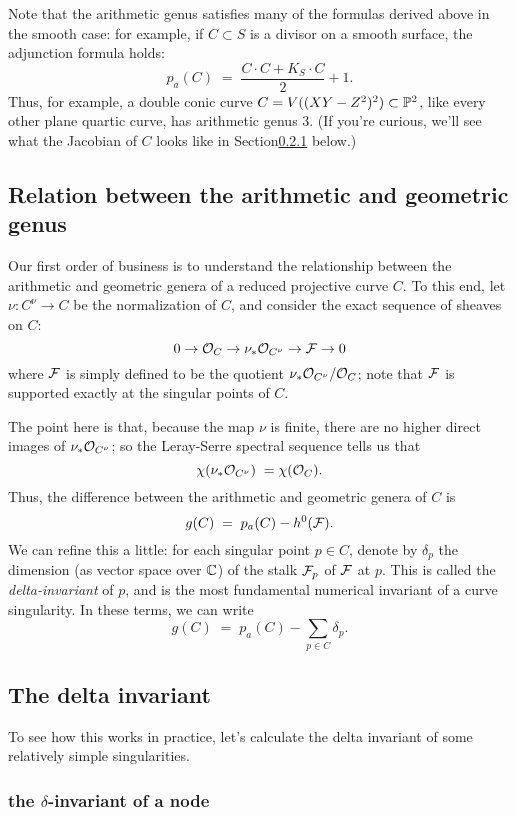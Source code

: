 Note that the arithmetic genus satisfies many of the formulas derived above in the smooth case: for example, if $C \subset S$ is a divisor on a smooth surface, the adjunction formula holds:
$$
p_a(C) \; = \; \frac{C\cdot C + K_S\cdot C}{2} + 1.
$$
Thus, for example, a double conic curve $C = V((XY-Z^2)^2) \subset {\mathbb P}^2$, like every other plane quartic curve, has arithmetic genus 3. (If you're curious, we'll see what the Jacobian of $C$ looks like in Section\ref{} below.)

\subsection{Relation between the arithmetic and geometric genus}

Our first order of business is to understand the relationship between the arithmetic and geometric genera of a reduced projective curve $C$. To this end, let $\nu : C^\nu \to C$ be the normalization of $C$, and consider the exact sequence of sheaves on $C$:
$$
0 \to {\mathcal O}_C \to \nu_*{\mathcal O}_{C^\nu} \to {\mathcal F} \to 0
$$
where ${\mathcal F}$ is simply defined to be the quotient $\nu_*{\mathcal O}_{C^\nu}/{\mathcal O}_C$; note that ${\mathcal F}$ is supported exactly at the singular points of $C$.

The point here is that, because the map $\nu$ is finite, there are no higher direct images of $\nu_*{\mathcal O}_{C^\nu}$; so the Leray-Serre spectral sequence tells us that
$$
\chi(\nu_*{\mathcal O}_{C^\nu}) \; = \chi({\mathcal O}_C).
$$
Thus, the difference between the arithmetic and geometric genera of $C$ is
$$
g(C) \; = \; p_a(C) - h^0({\mathcal F}).
$$
We can refine this a little: for each singular point $p \in C$, denote by $\delta_p$ the dimension (as vector space over ${\mathbb C}$) of the stalk ${\mathcal F}_p$ of ${\mathcal F}$ at $p$. This is called the \emph{delta-invariant} of $p$, and is the most fundamental numerical invariant of a curve singularity. In these terms, we can write
$$
g(C) \; = \; p_a(C) - \sum_{p \in C} \delta_p.
$$

\subsection{The delta invariant}

To see how this works in practice, let's calculate the delta invariant of some relatively simple singularities.

\subsubsection{the $\delta$-invariant of a node}


